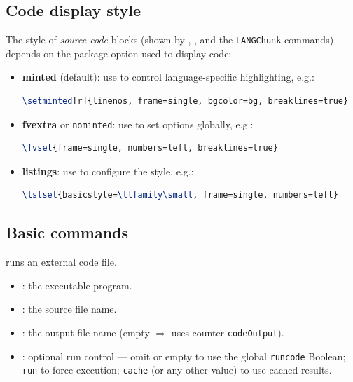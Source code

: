 \documentclass{ltxdoc}
\newcommand{\pkg}[1]{\textsf{#1}}
\newcommand{\opt}[1]{\texttt{#1}}
\begin{document}
\subsection{Code display style}

The style of \emph{source code} blocks (shown by ,
, and the \texttt{LANG\texttt{Chunk}} commands)
depends on the package option used to display code:

\begin{itemize}
  \item \textbf{\pkg{minted}} (default): use  to control
    language-specific highlighting, e.g.:
\begin{lstlisting}[language=tex]
\setminted[r]{linenos, frame=single, bgcolor=bg, breaklines=true}
\end{lstlisting}
  \item \textbf{\pkg{fvextra}} or \opt{nominted}: use  to set
    options globally, e.g.:
\begin{lstlisting}[language=tex]
\fvset{frame=single, numbers=left, breaklines=true}
\end{lstlisting}
  \item \textbf{\pkg{listings}}: use  to configure the style,
    e.g.:
\begin{lstlisting}[language=tex]
\lstset{basicstyle=\ttfamily\small, frame=single, numbers=left}
\end{lstlisting}
\end{itemize}

\subsection{Basic commands}

\DescribeMacro{\runExtCode}
runs an external code file.
\begin{itemize}
  \item {}: the executable program.
  \item {}: the source file name.
  \item {}: the output file name (empty $\Rightarrow$ uses
    counter \texttt{codeOutput}).
  \item {}: optional run control --- omit or empty to use the
    global \texttt{runcode} Boolean; \texttt{run} to force execution;
    \texttt{cache} (or any other value) to use cached results.
\end{itemize}
\end{document}
